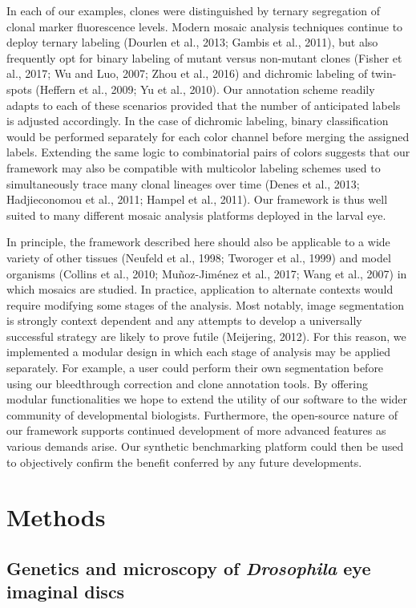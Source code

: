 In each of our examples, clones were distinguished by ternary segregation of clonal marker fluorescence levels. Modern mosaic analysis techniques continue to deploy ternary labeling (Dourlen et al., 2013; Gambis et al., 2011), but also frequently opt for binary labeling of mutant versus non-mutant clones (Fisher et al., 2017; Wu and Luo, 2007; Zhou et al., 2016) and dichromic labeling of twin-spots (Heffern et al., 2009; Yu et al., 2010). Our annotation scheme readily adapts to each of these scenarios provided that the number of anticipated labels is adjusted accordingly. In the case of dichromic labeling, binary classification would be performed separately for each color channel before merging the assigned labels. Extending the same logic to combinatorial pairs of colors suggests that our framework may also be compatible with multicolor labeling schemes used to simultaneously trace many clonal lineages over time (Denes et al., 2013; Hadjieconomou et al., 2011; Hampel et al., 2011). Our framework is thus well suited to many different mosaic analysis platforms deployed in the larval eye.

In principle, the framework described here should also be applicable to a wide variety of other tissues (Neufeld et al., 1998; Tworoger et al., 1999) and model organisms (Collins et al., 2010; Muñoz-Jiménez et al., 2017; Wang et al., 2007) in which mosaics are studied. In practice, application to alternate contexts would require modifying some stages of the analysis. Most notably, image segmentation is strongly context dependent and any attempts to develop a universally successful strategy are likely to prove futile (Meijering, 2012). For this reason, we implemented a modular design in which each stage of analysis may be applied separately. For example, a user could perform their own segmentation before using our bleedthrough correction and clone annotation tools. By offering modular functionalities we hope to extend the utility of our software to the wider community of developmental biologists. Furthermore, the open-source nature of our framework supports continued development of more advanced features as various demands arise. Our synthetic benchmarking platform could then be used to objectively confirm the benefit conferred by any future developments.

\section{Methods}

\subsection{Genetics and microscopy of \textit{Drosophila} eye imaginal discs}

